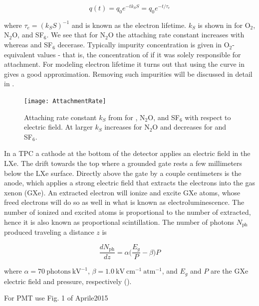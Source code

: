 \begin{equation}
q(t) = q_{0}e^{-tk_{S}S} = q_{0}e^{-t/\tau_{e}}
\label{eq:lifetime_equation}
\end{equation}

\noindent where $\tau_{e} = (k_{S}S)^{-1}$ and is known as the electron lifetime.  $k_{S}$ is shown in  for
O$_{2}$,
N$_{2}$O, and SF$_{6}$.  We see that for N$_{2}$O the attaching rate constant increases with \efield whereas \otwo and SF$_{6}$
decerase.  Typically impurity concentration is given in O$_{2}$-equivalent values - that is, the concentration of \otwo if it was solely
responsible for \electron attachment.  For modeling electron lifetime it turns out that using the \otwo curve in
 gives a good approximation.  Removing such impurities will be discussed in detail in \secref{}.

\begin{figure}
\texttt{[image: AttachmentRate]}
\caption{Attaching rate constant $k_{S}$ from  for \otwo, N$_{2}$O, and SF$_{6}$ with respect to electric field.  At
larger \efield $k_{S}$ increases for N$_{2}$O and decreases for \otwo and SF$_{6}$.}
\label{fig:attachment_rate}
\end{figure}

In a TPC a cathode at the bottom of the detector applies an electric field in the LXe.  The \electron drift towards the top where a
grounded gate rests a few millimeters below the LXe surface.  Directly above the gate by a couple centimeters is the anode, which
applies a strong electric field that extracts the electrons into the gas xenon (GXe).  An extracted electron will ionize and excite
GXe atoms, whose freed electrons will do so as well in what is known as electroluminescence.  The number of ionized and excited atoms
is proportional to the number of \electron extracted, hence it is also known as proportional scintillation.  The number of photons
$N_{\mathrm{ph}}$ produced traveling a distance $z$ is

\begin{equation}
\frac{dN_{\mathrm{ph}}}{dz} = \alpha \Big( \frac{E_{g}}{P} - \beta \Big) P
\label{eq:electronlum}
\end{equation}

\noindent where $\alpha = 70\ \mathrm{photons\ kV^{-1}}$, $\beta = 1.0\ \mathrm{kV\ cm^{-1}\ atm^{-1}}$, and $E_{g}$ and $P$ are the
GXe electric field and pressure, respectively ().

For PMT use Fig. 1 of Aprile2015